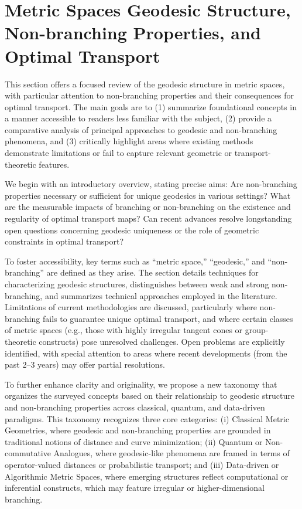 \documentclass[sigconf]{acmart}
\begin{document}
\section{Metric Spaces Geodesic Structure, Non-branching Properties, and Optimal Transport}

This section offers a focused review of the geodesic structure in metric spaces, with particular attention to non-branching properties and their consequences for optimal transport. The main goals are to (1) summarize foundational concepts in a manner accessible to readers less familiar with the subject, (2) provide a comparative analysis of principal approaches to geodesic and non-branching phenomena, and (3) critically highlight areas where existing methods demonstrate limitations or fail to capture relevant geometric or transport-theoretic features.

We begin with an introductory overview, stating precise aims: 
Are non-branching properties necessary or sufficient for unique geodesics in various settings? What are the measurable impacts of branching or non-branching on the existence and regularity of optimal transport maps? Can recent advances resolve longstanding open questions concerning geodesic uniqueness or the role of geometric constraints in optimal transport?

To foster accessibility, key terms such as ``metric space,'' ``geodesic,'' and ``non-branching'' are defined as they arise. The section details techniques for characterizing geodesic structures, distinguishes between weak and strong non-branching, and summarizes technical approaches employed in the literature. Limitations of current methodologies are discussed, particularly where non-branching fails to guarantee unique optimal transport, and where certain classes of metric spaces (e.g., those with highly irregular tangent cones or group-theoretic constructs) pose unresolved challenges. Open problems are explicitly identified, with special attention to areas where recent developments (from the past 2--3 years) may offer partial resolutions.

To further enhance clarity and originality, we propose a new taxonomy that organizes the surveyed concepts based on their relationship to geodesic structure and non-branching properties across classical, quantum, and data-driven paradigms. This taxonomy recognizes three core categories: (i) Classical Metric Geometries, where geodesic and non-branching properties are grounded in traditional notions of distance and curve minimization; (ii) Quantum or Non-commutative Analogues, where geodesic-like phenomena are framed in terms of operator-valued distances or probabilistic transport; and (iii) Data-driven or Algorithmic Metric Spaces, where emerging structures reflect computational or inferential constructs, which may feature irregular or higher-dimensional branching.
\end{document}
